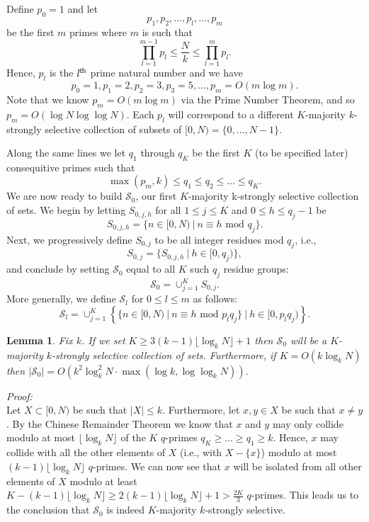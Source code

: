 \documentclass{article}
\begin{document}
Define $p_{0} = 1$ and let 
$$p_{1}, p_{2}, \dots, p_{l}, \dots, p_{m}$$ 
be the first $m$ primes where $m$ is such that
$$\prod^{m-1}_{l=1} p_{l} \leq \frac{N}{k} \leq \prod^{m}_{l=1} p_{l}.$$
Hence, $p_{l}$ is the $l^{\rm th}$ prime natural number and we have
$$p_{0} = 1, p_{1} = 2, p_{2} = 3, p_{3} = 5, \dots, p_{m} = O(m \log m).$$
Note that we know $p_{m} = O(m \log m)$ via the Prime Number Theorem, and so $p_{m} = O(\log N \log\log N)$.  Each $p_{l}$ will correspond to a different $K$-majority $k$-strongly selective collection of subsets of $[0,N) = \{0, \dots, N-1 \}$.

Along the same lines we let $q_{1}$ through $q_{K}$ be the first $K$ (to be specified later) consequitive primes such that
$$\max( p_{m}, k ) \leq q_{1} \leq q_{2} \leq \dots \leq q_{K}.$$  
We are now ready to build $\mathcal{S}_{0}$, our first $K$-majority k-strongly selective collection of sets.  We begin by letting $S_{0,j,h}$ for all $1 \leq j \leq K$ and $0 \leq h \leq q_{j}-1$ be
$$S_{0,j,h} = \{ n \in [0,N)~|~n \equiv h \textrm{ mod } q_{j} \}.$$
Next, we progressively define $S_{0,j}$ to be all integer residues mod $q_{j}$, i.e., 
$$S_{0,j} = \{ S_{0,j,h}~|~ h \in [0,q_{j}) \},$$
and conclude by setting $\mathcal{S}_{0}$ equal to all $K$ such $q_j$ residue groups:
$$\mathcal{S}_{0} = \cup^{K}_{j = 1} S_{0,j}.$$
More generally, we define $\mathcal{S}_{l}$ for $0 \leq l \leq m$ as follows:
$$\mathcal{S}_{l} = \cup^{K}_{j=1} \left\{ \{ n \in [0,N)~|~n \equiv h \textrm{ mod } p_{l}q_{j} \}~\big|~h \in [0,p_{l}q_{j}) \right\}.$$

\newtheorem{Lemma}{Lemma}
\begin{Lemma}
Fix $k$.  If we set $K \geq 3 (k - 1) \lfloor \log_{k} N \rfloor + 1$ then $\mathcal{S}_{0}$ will be a $K$-majority $k$-strongly selective collection of sets.  Furthermore, if $K = O(k \log_{k} N)$ then $| \mathcal{S}_{0} | = O\left(k^{2} \log^{2}_{k} N \cdot \max(\log k, \log \log_{k} N )\right)$.
\label{lem:S0strong}
\end{Lemma}

\noindent \textit{Proof:}\\

Let $X \subset [0,N)$ be such that $|X| \leq k$.  Furthermore, let $x,y \in X$ be such that $x \neq y$.  By the Chinese Remainder Theorem we know that $x$ and $y$ may only collide modulo at most $\lfloor \log_{k} N \rfloor$ of the $K$ $q$-primes $q_{K} \geq \dots \geq q_{1} \geq k$.  Hence, $x$ may collide with all the other elements of $X$ (i.e., with $X - \{x \}$) modulo at most $(k - 1) \lfloor \log_{k} N \rfloor$ $q$-primes.  We can now see that $x$ will be isolated from all other elements of $X$ modulo at least $K - (k - 1) \lfloor \log_{k} N \rfloor \geq 2 (k - 1) \lfloor \log_{k} N \rfloor + 1 > \frac{2K}{3}$ $q$-primes.  This leads us to the conclusion that $\mathcal{S}_{0}$ is indeed $K$-majority $k$-strongly selective.
\end{document}
